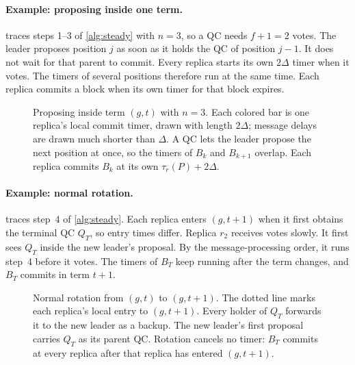 \documentclass[11pt,a4paper]{article}
\begin{document}
\paragraph{Example: proposing inside one term.}
 traces steps 1--3 of \cref{alg:steady} with $n=3$, so a
QC needs $f+1=2$ votes. The leader proposes position $j$ as soon as it
holds the QC of position $j-1$. It does not wait for that parent to commit.
Every replica starts its own $2\Delta$ timer when it votes. The timers of
several positions therefore run at the same time. Each replica commits a
block when its own timer for that block expires.

\begin{figure}[htbp]\centering

\caption{Proposing inside term $(g,t)$ with $n=3$. Each colored bar is one
replica's local commit timer, drawn with length $2\Delta$; message delays
are drawn much shorter than $\Delta$. A QC lets the leader propose the next
position at once, so the timers of $B_k$ and $B_{k+1}$ overlap. Each
replica commits $B_k$ at its own $\tau_r(P)+2\Delta$.}
\label{fig:steady}
\end{figure}



\paragraph{Example: normal rotation.}
 traces step~4 of \cref{alg:steady}. Each replica enters
$(g,t+1)$ when it first obtains the terminal QC $Q_T$, so entry times
differ. Replica $r_2$ receives votes slowly. It first sees $Q_T$ inside
the new leader's proposal. By the message-processing order, it runs
step~4 before it votes. The timers of $B_T$ keep running after the term
changes, and $B_T$ commits in term $t+1$.

\begin{figure}[htbp]\centering

\caption{Normal rotation from $(g,t)$ to $(g,t+1)$. The dotted line marks
each replica's local entry to $(g,t+1)$. Every holder of $Q_T$ forwards it
to the new leader as a backup. The new leader's first proposal carries
$Q_T$ as its parent QC. Rotation cancels no timer: $B_T$ commits at every
replica after that replica has entered $(g,t+1)$.}
\label{fig:rotation}
\end{figure}
\end{document}
